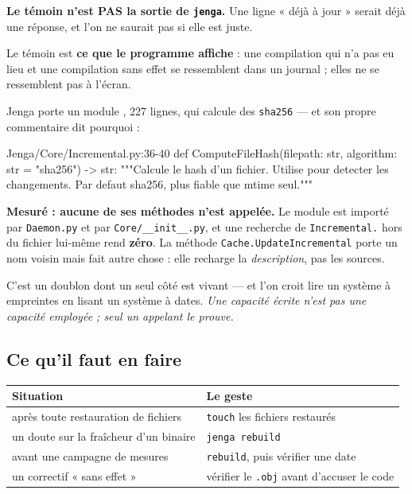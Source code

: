 \begin{nkretenir}
\textbf{Le témoin n'est PAS la sortie de \texttt{jenga}.} Une ligne
« déjà à jour » serait déjà une réponse, et l'on ne saurait pas si elle est
juste.

Le témoin est \textbf{ce que le programme affiche} : une compilation qui n'a pas
eu lieu et une compilation sans effet se ressemblent dans un journal ; elles ne
se ressemblent pas à l'écran.
\end{nkretenir}

\begin{nkretenir}
Jenga porte un module , 227 lignes, qui calcule
des \texttt{sha256} --- et son propre commentaire dit pourquoi :

\begin{nkcode}{Jenga/Core/Incremental.py:36-40}
def ComputeFileHash(filepath: str, algorithm: str = "sha256") -> str:
    """Calcule le hash d'un fichier. Utilise pour detecter les changements.
    Par defaut sha256, plus fiable que mtime seul."""
\end{nkcode}

\textbf{Mesuré : aucune de ses méthodes n'est appelée.} Le module est importé par
\texttt{Daemon.py} et par \texttt{Core/\_\_init\_\_.py}, et une recherche de
\texttt{Incremental.} hors du fichier lui-même rend \textbf{zéro}. La méthode
\texttt{Cache.UpdateIncremental} porte un nom voisin mais fait autre chose :
elle recharge la \emph{description}, pas les sources.

C'est un doublon dont un seul côté est vivant --- et l'on croit lire un système à
empreintes en lisant un système à dates. \emph{Une capacité écrite n'est pas une
capacité employée ; seul un appelant le prouve.}
\end{nkretenir}

\subsection*{Ce qu'il faut en faire}

\begin{center}
\begin{tabular}{@{}ll@{}}
\toprule
\textbf{Situation} & \textbf{Le geste} \\
\midrule
après toute restauration de fichiers & \texttt{touch} les fichiers restaurés \\
un doute sur la fraîcheur d'un binaire & \texttt{jenga rebuild} \\
avant une campagne de mesures & \texttt{rebuild}, puis vérifier une date \\
un correctif « sans effet » & vérifier le \texttt{.obj} avant d'accuser le code \\
\bottomrule
\end{tabular}
\end{center}

